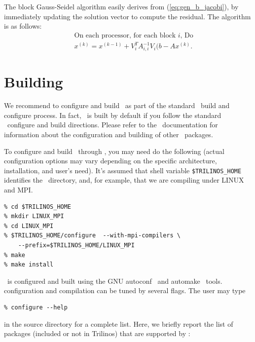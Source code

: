 The block Gauss-Seidel algorithm easily derives from
(\ref{eq:gen_b_jacobi}), by immediately updating the solution vector to
compute the residual. The algorithm is as follows:
\begin{eqnarray}
&& \mbox{On each processor, for each block $i$, Do} \\
&& \label{eq:gen_b_gs}
x^{(k)} = x^{(k-1)} + V_i^T A_{i,i}^{-1} V_i(b - A x^{(k)}.
\end{eqnarray}

\section{Building \ifpack}
\label{sec:config}

We recommend to configure and build \ifpack\ as part of the standard 
\trilinos~build and configure process.  In fact,
\ifpack\ is built by default if you follow the standard \trilinos~configure
and build directions. Please refer to the \trilinos~documentation 
for information about the configuration and building of
other \trilinos~packages.

\smallskip

To configure and build \ifpack\ through \trilinos, you may need do the
following (actual configuration options may vary depending on the
specific architecture, installation, and user's need).  It's assumed
that shell variable \verb!$TRILINOS_HOME!  identifies the
\trilinos~directory, and, for example, that we are compiling under LINUX
and MPI.
\begin{verbatim}
% cd $TRILINOS_HOME
% mkdir LINUX_MPI
% cd LINUX_MPI
% $TRILINOS_HOME/configure  --with-mpi-compilers \
    --prefix=$TRILINOS_HOME/LINUX_MPI
% make
% make install
\end{verbatim}

\ifpack\ is configured and built using the GNU autoconf~\cite{Autoconf} and
automake~\cite{Automake} tools. 
\ifpack configuration and compilation can be tuned by several flags.
The user may type 
\begin{verbatim}
% configure --help
\end{verbatim}
in the \ifpack source directory for a complete list. Here, we briefly report
the list of packages (included or not in Trilinos) that are supported 
by \ifpack:

